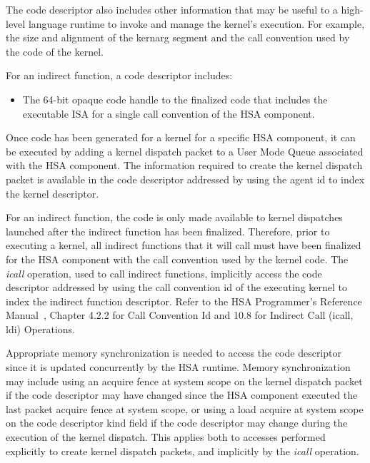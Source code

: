 \documentclass[final]{book}
\begin{document}
The code descriptor also includes other information that may be useful to a high-level
language runtime to invoke and manage the kernel's execution. For example, the size
and alignment of the kernarg segment and the call convention used by the code of the
kernel.

For an indirect function, a code descriptor includes:
\begin{itemize}
\item{The 64-bit opaque code handle to the finalized code that includes the executable
ISA for a single call convention of the HSA component.}
\end{itemize}

Once code has been generated for a kernel for a specific HSA component, it can be
executed by adding a kernel dispatch packet to a User Mode Queue associated with
the HSA component. The information required to create the kernel dispatch packet is
available in the code descriptor addressed by using the agent id to index the kernel
descriptor.

For an indirect function, the code is only made available to kernel dispatches launched
after the indirect function has been finalized. Therefore, prior to executing a kernel,
all indirect functions that it will call must have been finalized for the HSA component
with the call convention used by the kernel code. The \emph{icall} operation, used to call
indirect functions, implicitly access the code descriptor addressed by using the call
convention id of the executing kernel to index the indirect function descriptor. Refer to
the HSA Programmer's Reference Manual~\cite{prm}, Chapter 4.2.2 for Call Convention Id and 10.8 for
Indirect Call (icall, ldi) Operations.

Appropriate memory synchronization is needed to access the code descriptor since
it is updated concurrently by the HSA runtime. Memory synchronization may include
using an acquire fence at system scope on the kernel dispatch packet if the code
descriptor may have changed since the HSA component executed the last packet
acquire fence at system scope, or using a load acquire at system scope on the code
descriptor kind field if the code descriptor may change during the execution of the
kernel dispatch. This applies both to accesses performed explicitly to create kernel
dispatch packets, and implicitly by the \emph{icall} operation.
\end{document}
